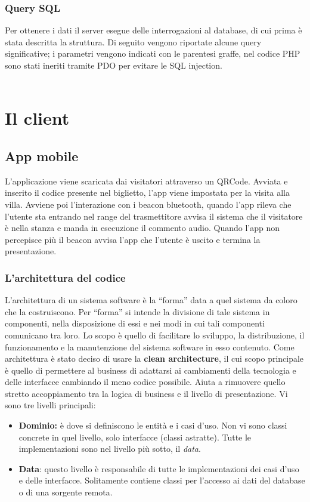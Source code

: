 \documentclass[12pt]{article}
\begin{document}
\subsubsection{Query SQL}
Per ottenere i dati il server esegue delle interrogazioni al database, di cui prima è stata descritta la struttura. Di seguito vengono riportate alcune query significative; i parametri vengono indicati con le parentesi graffe, nel codice PHP sono stati ineriti tramite PDO per evitare le SQL injection.\\\\

\section{Il client}
\subsection{App mobile}
L'applicazione viene scaricata dai visitatori attraverso un QRCode. Avviata
e inserito il codice presente nel biglietto, l’app viene impostata per la visita alla villa. Avviene poi l'interazione con i beacon bluetooth, quando l’app rileva che l'utente sta entrando nel range del trasmettitore avvisa il sistema che il visitatore è nella stanza e manda in esecuzione il commento audio. Quando l’app non percepisce più il beacon avvisa l’app che l’utente è uscito e termina la presentazione.

\subsubsection{L'architettura del codice}
L’architettura di un sistema software è la “forma” data a quel sistema da coloro che la costruiscono. Per  “forma” si intende la divisione di tale sistema in componenti, nella disposizione di essi e nei modi in cui tali componenti comunicano tra loro. Lo scopo è  quello di facilitare lo sviluppo, la distribuzione, il funzionamento e la manutenzione del sistema software in esso contenuto.\cite{architettura_codice}
Come architettura è stato deciso di usare la \textbf{clean architecture}, il cui scopo principale è quello di permettere al business di adattarsi ai cambiamenti della tecnologia e delle interfacce cambiando il meno codice possibile. Aiuta a rimuovere quello stretto accoppiamento tra la logica di business e il livello di presentazione.\cite{architettura_introduction} Vi sono tre livelli principali:
\begin{itemize}
    \item \textbf{Dominio:} è dove si definiscono le entità e i casi d'uso. Non vi sono classi concrete in quel livello, solo interfacce (classi astratte). Tutte le implementazioni sono nel livello più sotto, il \emph{data}. 
    \item \textbf{Data}: questo livello è responsabile di tutte le implementazioni dei casi d'uso e delle interfacce. Solitamente contiene classi per l'accesso ai dati del database o di una sorgente remota.
\end{itemize}
\end{document}
